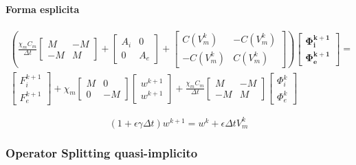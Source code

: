 \documentclass[a4paper]{article}
\theoremstyle{definition}
\begin{document}
\paragraph{Forma esplicita}
\begin{equation}
\begin{gathered}
\left( \frac{\chi_m C_m}{\Delta t} \begin{bmatrix} M & -M \\ -M & M \end{bmatrix} + \begin{bmatrix} A_i & 0 \\ 0 & A_e \end{bmatrix} + 
\begin{bmatrix}
C(V_m^k) & -C(V_m^k) \\ -C(V_m^k) & C(V_m^k)
\end{bmatrix}\right)
\begin{bmatrix} \bm{\Phi_i^{k+1}} \\ \bm{\Phi_e^{k+1}} \end{bmatrix} = 
\\
\begin{bmatrix} F_i^{k+1} \\ F_e^{k+1} \end{bmatrix} 
+ \chi_m \begin{bmatrix}M & 0 \\ 0 & -M \end{bmatrix}
\begin{bmatrix} w^{k+1} \\ w^{k+1} \end{bmatrix}
+ \frac{\chi_m C_m}{\Delta t} \begin{bmatrix}M & -M \\ -M & M\end{bmatrix}
\begin{bmatrix} \Phi_i^{k} \\ \Phi_e^{k} \end{bmatrix}
\end{gathered}
\end{equation}

\vspace{5mm}
\begin{equation}
(1+\epsilon \gamma \Delta t)w^{k+1} = w^k + \epsilon \Delta t V_m^k
\end{equation}

\newpage
\subsubsection{Operator Splitting quasi-implicito}
\end{document}
